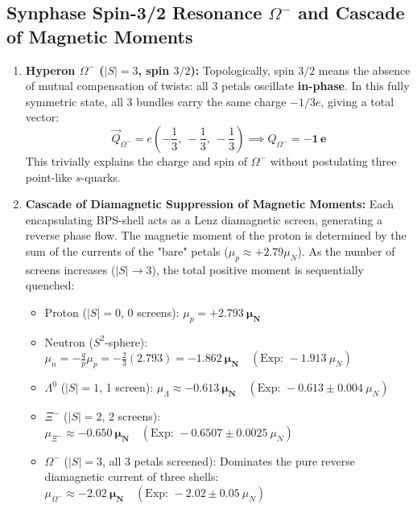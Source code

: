 \documentclass[12pt,a4paper]{article}
\begin{document}
		\subsection{Synphase Spin-3/2 Resonance $\Omega^-$ and Cascade of Magnetic Moments}
		\begin{enumerate}
			\item \textbf{Hyperon $\Omega^-$ ($|S|=3$, spin $3/2$):}
			Topologically, spin $3/2$ means the absence of mutual compensation of twists: all 3 petals oscillate \textbf{in-phase}. 
			In this fully symmetric state, all 3 bundles carry the same charge $-1/3 e$, giving a total vector:
			\begin{equation}
				\vec{Q}_{\Omega^-} = e \left(-\frac{1}{3}, \ -\frac{1}{3}, \ -\frac{1}{3}\right) \implies Q_{\Omega^-} = \mathbf{-1 \, e}
			\end{equation}
			This trivially explains the charge and spin of $\Omega^-$ without postulating three point-like $s$-quarks.
			
			\item \textbf{Cascade of Diamagnetic Suppression of Magnetic Moments:}
			Each encapsulating BPS-shell acts as a Lenz diamagnetic screen, generating a reverse phase flow. The magnetic moment of the proton is determined by the sum of the currents of the "bare" petals ($\mu_p \approx +2.79 \mu_N$). As the number of screens increases ($|S| \to 3$), the total positive moment is sequentially quenched:
			\begin{itemize}
				\item Proton ($|S|=0$, 0 screens): $\mu_p = \mathbf{+2.793 \ \mu_N}$
				\item Neutron ($S^2$-sphere): $\mu_n = -\frac{q}{p} \mu_p = -\frac{2}{3}(2.793) = \mathbf{-1.862 \ \mu_N} \quad (\text{Exp: } -1.913 \ \mu_N)$
				\item $\Lambda^0$ ($|S|=1$, 1 screen): $\mu_{\Lambda} \approx \mathbf{-0.613 \ \mu_N} \quad (\text{Exp: } -0.613 \pm 0.004 \ \mu_N)$
				\item $\Xi^-$ ($|S|=2$, 2 screens): $\mu_{\Xi^-} \approx \mathbf{-0.650 \ \mu_N} \quad (\text{Exp: } -0.6507 \pm 0.0025 \ \mu_N)$
				\item $\Omega^-$ ($|S|=3$, all 3 petals screened): Dominates the pure reverse diamagnetic current of three shells: $\mu_{\Omega^-} \approx \mathbf{-2.02 \ \mu_N} \quad (\text{Exp: } -2.02 \pm 0.05 \ \mu_N)$
			\end{itemize}
		\end{enumerate}
		
\end{document}
